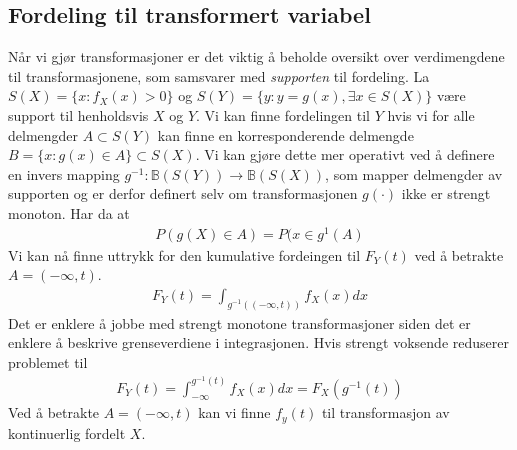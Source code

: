 \subsection{Fordeling til transformert variabel}
Når vi gjør transformasjoner er det viktig å beholde oversikt over verdimengdene til transformasjonene, som samsvarer med \textit{supporten} til fordeling. La $S(X)=\{x:f_X(x)>0\}$ og $S(Y)=\{y:y=g(x), \exists x \in S(X)\}$ være support til henholdsvis $X$ og $Y$. Vi kan finne fordelingen til $Y$ hvis vi for alle delmengder $A \subset S(Y)$ kan finne en korresponderende delmengde $B=\{x:g(x) \in A\} \subset S(X)$. Vi kan gjøre dette mer operativt ved å definere en invers mapping $g^{-1}:\mathbb{B}(S(Y)) \to \mathbb{B}(S(X))$, som mapper delmengder av supporten og er derfor definert selv om transformasjonen $g(\cdot)$ ikke er strengt monoton. Har da at 
\begin{align}
P(g(X) \in A) = P(x \in g^{1}(A)
\end{align} 
Vi kan nå finne uttrykk for den kumulative fordeingen til $F_Y(t)$ ved å betrakte $A = (-\infty,t)$.
\begin{align}
F_Y(t) = \int_{g^{-1}((-\infty,t))}f_X(x)dx
\end{align}
Det er enklere å jobbe med strengt monotone transformasjoner siden det er enklere å beskrive grenseverdiene i integrasjonen. Hvis strengt voksende reduserer problemet til
\begin{align}
F_Y(t) = \int_{-\infty}^{g^{-1}(t)}f_X(x)dx=F_X(g^{-1}(t))
\end{align}
Ved å betrakte $A = (-\infty,t)$ kan vi finne $f_y(t)$ til transformasjon av kontinuerlig fordelt $X$.
